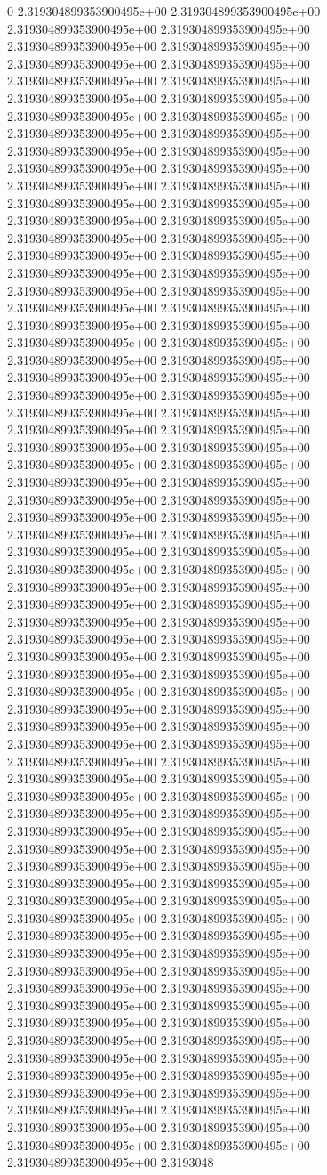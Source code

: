 0	2.319304899353900495e+00	2.319304899353900495e+00	2.319304899353900495e+00	2.319304899353900495e+00	2.319304899353900495e+00	2.319304899353900495e+00	2.319304899353900495e+00	2.319304899353900495e+00	2.319304899353900495e+00	2.319304899353900495e+00	2.319304899353900495e+00	2.319304899353900495e+00	2.319304899353900495e+00	2.319304899353900495e+00	2.319304899353900495e+00	2.319304899353900495e+00	2.319304899353900495e+00	2.319304899353900495e+00	2.319304899353900495e+00	2.319304899353900495e+00	2.319304899353900495e+00	2.319304899353900495e+00	2.319304899353900495e+00	2.319304899353900495e+00	2.319304899353900495e+00	2.319304899353900495e+00	2.319304899353900495e+00	2.319304899353900495e+00	2.319304899353900495e+00	2.319304899353900495e+00	2.319304899353900495e+00	2.319304899353900495e+00	2.319304899353900495e+00	2.319304899353900495e+00	2.319304899353900495e+00	2.319304899353900495e+00	2.319304899353900495e+00	2.319304899353900495e+00	2.319304899353900495e+00	2.319304899353900495e+00	2.319304899353900495e+00	2.319304899353900495e+00	2.319304899353900495e+00	2.319304899353900495e+00	2.319304899353900495e+00	2.319304899353900495e+00	2.319304899353900495e+00	2.319304899353900495e+00	2.319304899353900495e+00	2.319304899353900495e+00	2.319304899353900495e+00	2.319304899353900495e+00	2.319304899353900495e+00	2.319304899353900495e+00	2.319304899353900495e+00	2.319304899353900495e+00	2.319304899353900495e+00	2.319304899353900495e+00	2.319304899353900495e+00	2.319304899353900495e+00	2.319304899353900495e+00	2.319304899353900495e+00	2.319304899353900495e+00	2.319304899353900495e+00	2.319304899353900495e+00	2.319304899353900495e+00	2.319304899353900495e+00	2.319304899353900495e+00	2.319304899353900495e+00	2.319304899353900495e+00	2.319304899353900495e+00	2.319304899353900495e+00	2.319304899353900495e+00	2.319304899353900495e+00	2.319304899353900495e+00	2.319304899353900495e+00	2.319304899353900495e+00	2.319304899353900495e+00	2.319304899353900495e+00	2.319304899353900495e+00	2.319304899353900495e+00	2.319304899353900495e+00	2.319304899353900495e+00	2.319304899353900495e+00	2.319304899353900495e+00	2.319304899353900495e+00	2.319304899353900495e+00	2.319304899353900495e+00	2.319304899353900495e+00	2.319304899353900495e+00	2.319304899353900495e+00	2.319304899353900495e+00	2.319304899353900495e+00	2.319304899353900495e+00	2.319304899353900495e+00	2.319304899353900495e+00	2.319304899353900495e+00	2.319304899353900495e+00	2.319304899353900495e+00	2.319304899353900495e+00	2.319304899353900495e+00	2.319304899353900495e+00	2.319304899353900495e+00	2.319304899353900495e+00	2.319304899353900495e+00	2.319304899353900495e+00	2.319304899353900495e+00	2.319304899353900495e+00	2.319304899353900495e+00	2.319304899353900495e+00	2.319304899353900495e+00	2.319304899353900495e+00	2.319304899353900495e+00	2.319304899353900495e+00	2.319304899353900495e+00	2.319304899353900495e+00	2.319304899353900495e+00	2.319304899353900495e+00	2.319304899353900495e+00	2.319304899353900495e+00	2.319304899353900495e+00	2.319304899353900495e+00	2.319304899353900495e+00	2.319304899353900495e+00	2.319304899353900495e+00	2.319304899353900495e+00	2.319304899353900495e+00	2.319304899353900495e+00	2.319304899353900495e+00	2.319304899353900495e+00	2.319304899353900495e+00	2.319304899353900495e+00	2.319304899353900495e+00	2.3193048